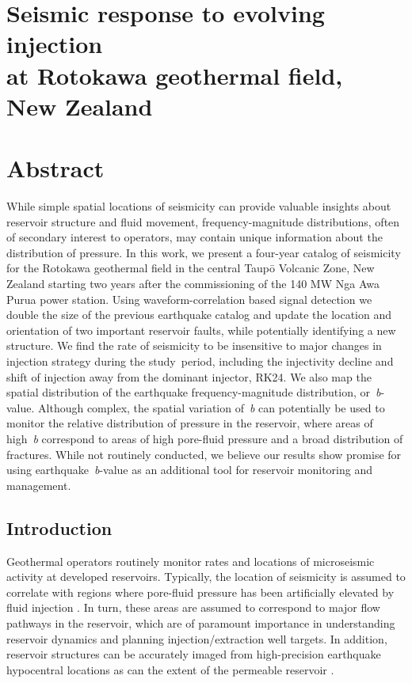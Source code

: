 \chapter[Seismic response to evolving injection at Rotokawa geothermal field, New Zealand]{Seismic response to evolving injection \\at Rotokawa geothermal field, \\New Zealand}

\chapter*{Abstract}
While simple spatial locations of seismicity can provide valuable
insights about reservoir structure and fluid movement,
frequency-magnitude distributions, often of secondary interest to
operators, may contain unique information about the distribution of
pressure. In this work, we present a four-year catalog of seismicity for
the Rotokawa geothermal field in the central Taup\={o} Volcanic Zone, New
Zealand starting two years after the commissioning of the 140 MW Nga Awa
Purua power station. Using waveform-correlation based signal detection
we double the size of the previous earthquake catalog and update the
location and orientation of two important reservoir faults, while
potentially identifying a new structure. We find the rate of seismicity
to be insensitive to major changes in injection strategy during the
study~period, including the injectivity decline and shift of injection
away from the dominant injector, RK24. We also map the spatial
distribution of the earthquake frequency-magnitude distribution,
or~\emph{b}-value. Although complex, the spatial variation of~\emph{b}
can potentially be used to monitor the relative distribution of pressure
in the reservoir, where areas of high~\emph{b} correspond to areas of
high pore-fluid pressure and a broad distribution of fractures. While
not routinely conducted, we believe our results show promise for using
earthquake~\emph{b}-value as an additional tool for reservoir monitoring
and management.

\section{Introduction}
Geothermal operators routinely monitor rates and locations of microseismic activity at developed reservoirs. Typically, the location of seismicity is assumed to correlate with regions where pore-fluid pressure has been artificially elevated by fluid injection \citep[e.g.][]{Sherburn_2015,Garcia_2016}. In turn, these areas are assumed to correspond to major flow pathways in the reservoir, which are of paramount importance in understanding reservoir dynamics and planning injection\slash{extraction} well targets. In addition, reservoir structures can be accurately imaged from high-precision earthquake hypocentral locations as can the extent of the permeable reservoir \citep{Sewell_2015WGC}.

